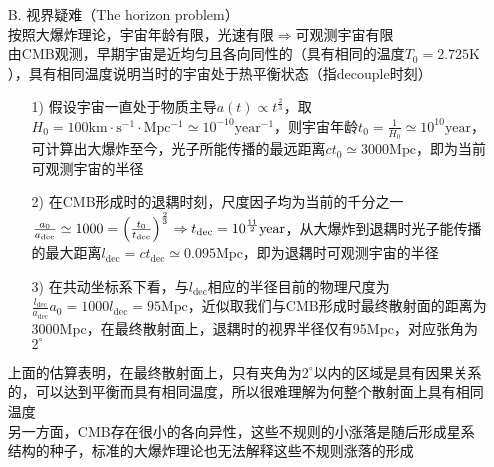 \begin{itemize}
	\item[B. ] 视界疑难（The horizon problem） \\
	按照大爆炸理论，宇宙年龄有限，光速有限$\Rightarrow$可观测宇宙有限 \\
	由CMB观测，早期宇宙是近均匀且各向同性的（具有相同的温度$T_0 = 2.725 \mathrm{K}$），具有相同温度说明当时的宇宙处于热平衡状态（指decouple时刻）
	\begin{itemize}
		\item[1)] 假设宇宙一直处于物质主导$a(t) \propto t^{\frac{2}{3}}$，取$H_0 = 100 \mathrm{km \cdot s^{-1} \cdot Mpc^{-1}} \simeq 10^{-10} \mathrm{year^{-1}}$，则宇宙年龄$t_0 = \frac{1}{H_0} \simeq 10^{10} \mathrm{year}$，可计算出大爆炸至今，光子所能传播的最远距离$c t_0 \simeq 3000 \mathrm{Mpc}$，即为当前可观测宇宙的半径
		\item[2)] 在CMB形成时的退耦时刻，尺度因子均为当前的千分之一$\frac{a_0}{a_{\text{dec}}} \simeq 1000 = \qty(\frac{t_0}{t_{\text{dec}}})^{\frac{2}{3}} \Rightarrow t_{\text{dec}} = 10^{\frac{11}{2}} \mathrm{year}$，从大爆炸到退耦时光子能传播的最大距离$l_{\text{dec}} = c t_{\text{dec}} \simeq 0.095 \mathrm{Mpc}$，即为退耦时可观测宇宙的半径
		\item[3)] 在共动坐标系下看，与$l_{\text{dec}}$相应的半径目前的物理尺度为$\frac{l_{\text{dec}}}{a_{\text{dec}}} a_0 = 1000 l_{\text{dec}} = 95 \mathrm{Mpc}$，近似取我们与CMB形成时最终散射面的距离为3000Mpc，在最终散射面上，退耦时的视界半径仅有95Mpc，对应张角为$2^{\circ}$
	\end{itemize}
	上面的估算表明，在最终散射面上，只有夹角为$2^{\circ}$以内的区域是具有因果关系的，可以达到平衡而具有相同温度，所以很难理解为何整个散射面上具有相同温度 \\
	另一方面，CMB存在很小的各向异性，这些不规则的小涨落是随后形成星系结构的种子，标准的大爆炸理论也无法解释这些不规则涨落的形成
	

\end{itemize}

